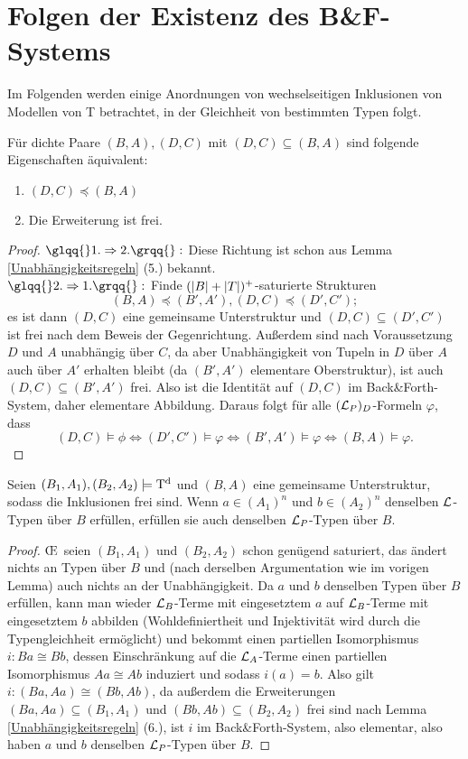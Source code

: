 \section{Folgen der Existenz des B\&F-Systems}
Im Folgenden werden einige Anordnungen von wechselseitigen Inklusionen von Modellen von T betrachtet, in der Gleichheit von bestimmten Typen folgt.

\begin{lemma}
	Für dichte Paare $(B,A),(D,C)$ mit $(D,C)\subseteq(B,A)$ sind folgende Eigenschaften äquivalent:
	\begin{enumerate}
		\item $(D,C)\preceq(B,A)$
		\item Die Erweiterung ist frei.
	\end{enumerate}
\end{lemma}
\begin{proof}
	$\glqq{}1.\Rightarrow2.\grqq{}:$ Diese Richtung ist schon aus Lemma \ref{Unabhängigkeitsregeln} (5.) bekannt.\\
	$\glqq{}2.\Rightarrow1.\grqq{}:$ Finde $({\left| B \right|}+{\left| T \right|})^+$-saturierte Strukturen $$(B,A)\preceq(B',A'),(D,C)\preceq(D',C');$$ es ist dann $(D,C)$ eine gemeinsame Unterstruktur und $(D,C)\subseteq(D',C')$ ist frei nach dem Beweis der Gegenrichtung. Außerdem sind nach Voraussetzung $D$ und $A$ unabhängig über $C$, da aber Unabhängigkeit von Tupeln in $D$ über $A$ auch über $A'$ erhalten bleibt (da $(B',A')$ elementare Oberstruktur), ist auch $(D,C)\subseteq(B',A')$ frei. Also ist die Identität auf $(D,C)$ im Back\&Forth-System, daher elementare Abbildung. Daraus folgt für alle $(\mathcal{L}_P)_D$-Formeln $\varphi$, dass $$(D,C)\models\phi\Leftrightarrow(D',C')\models\varphi\Leftrightarrow(B',A')\models\varphi\Leftrightarrow(B,A)\models\varphi.$$
\end{proof}

\begin{lemma}
	Seien $(B_1,A_1),(B_2,A_2)\models\operatorname{T^d}$ und $(B,A)$ eine gemeinsame Unterstruktur, sodass die Inklusionen frei sind. Wenn $a\in (A_1)^n$ und $b\in (A_2)^n$ denselben $\mathcal{L}$-Typen über $B$ erfüllen, erfüllen sie auch denselben $\mathcal{L}_P$-Typen über $B$.
\end{lemma}
\begin{proof}
	\OE\ seien $(B_1,A_1)$ und $(B_2,A_2)$ schon genügend saturiert, das ändert nichts an Typen über $B$ und (nach derselben Argumentation wie im vorigen Lemma) auch nichts an der Unabhängigkeit. Da $a$ und $b$ denselben Typen über $B$ erfüllen, kann man wieder $\mathcal{L}_B$-Terme mit eingesetztem $a$ auf $\mathcal{L}_B$-Terme mit eingesetztem $b$ abbilden (Wohldefiniertheit und Injektivität wird durch die Typengleichheit ermöglicht) und bekommt einen partiellen Isomorphismus $i:Ba\cong Bb$, dessen Einschränkung auf die $\mathcal{L}_A$-Terme einen partiellen Isomorphismus $Aa\cong Ab$ induziert und sodass $i(a)=b$. Also gilt $i:(Ba,Aa)\cong(Bb,Ab)$, da außerdem die Erweiterungen $(Ba,Aa)\subseteq(B_1,A_1)$ und $(Bb,Ab)\subseteq(B_2,A_2)$ frei sind nach Lemma \ref{Unabhängigkeitsregeln} (6.), ist $i$ im Back\&Forth-System, also elementar, also haben $a$ und $b$ denselben $\mathcal{L}_P$-Typen über $B$.
\end{proof}

